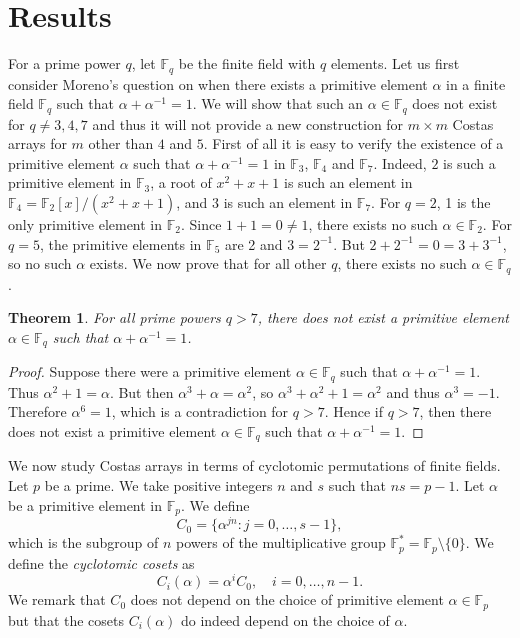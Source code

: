 \documentclass[10pt]{amsart}
\newtheorem{theorem}{Theorem}
\begin{document}
\section{Results}
For a prime power $q$, let $\mathbb{F}_q$ be the finite field with
$q$ elements.
Let us first consider Moreno's question \cite[Question~2]{MR1992966} on
when there exists a
primitive element $\alpha$ in a finite field $\mathbb{F}_q$ such
that $\alpha+\alpha^{-1}=1$. We will show that such an $\alpha \in \mathbb{F}_q$
does not  exist for $q \neq 3, 4, 7$ and
thus it will not provide a new construction for $m \times m$ Costas arrays for
$m$ other than $4$ and $5$.  First of all it is easy to verify the
existence of a primitive element $\alpha$ such that $\alpha +
\alpha^{-1} =1$ in $\mathbb{F}_3$,  $\mathbb{F}_4$ and
$\mathbb{F}_7$. Indeed, $2$ is such a primitive element in
$\mathbb{F}_3$, a root of $x^2+x+1$ is such an element in
$\mathbb{F}_4=\mathbb{F}_2[x]/(x^2+x+1)$, and $3$ is such
an element in $\mathbb{F}_7$. For $q=2$, 1 is the only
primitive element in $\mathbb{F}_2$. Since $1+1=0 \neq 1$, there
exists no such $\alpha \in \mathbb{F}_2$.
For $q=5$, the primitive elements in $\mathbb{F}_5$ are 2 and
$3=2^{-1}$. But $2+2^{-1}=0=3+3^{-1}$, so no such $\alpha$ exists.
We now prove that for all other $q$, there exists no such $\alpha \in
\mathbb{F}_q$.

\begin{theorem}
For all prime powers $q>7$, there does not exist a primitive element
$\alpha \in \mathbb{F}_q$ such that $\alpha+\alpha^{-1}=1$.
\end{theorem}
\begin{proof}
Suppose there were a primitive element $\alpha \in \mathbb{F}_q$ such that
$\alpha+\alpha^{-1}=1$. Thus $\alpha^2+1=\alpha$. But
then $\alpha^3+\alpha=\alpha^2$, so $\alpha^3+\alpha^2+1=\alpha^2$ and
thus $\alpha^3=-1$. Therefore $\alpha^6=1$, which is a contradiction
for $q>7$. Hence if $q>7$, then
there does not exist a primitive element $\alpha \in \mathbb{F}_q$ such that
$\alpha+\alpha^{-1}=1$.
\end{proof}

We now study Costas arrays in terms of cyclotomic permutations of
finite fields.
Let $p$ be a prime. 
We take positive integers $n$ and $s$ such that
$ns=p-1$. Let $\alpha$ be a primitive element in $\mathbb{F}_p$.
We define
\[
C_0=\big \{\alpha^{jn}:j=0,\ldots,s-1 \big \},
\]
which is the subgroup
of $n$ powers of the
multiplicative group $\mathbb{F}_p^*=\mathbb{F}_p \setminus \{0\}$.
We define the {\em
cyclotomic cosets} as
\[
C_i(\alpha)=\alpha^i C_0, \quad i=0,\ldots,n-1.
\]
We remark that $C_0$ does not depend on the choice of 
primitive element $\alpha \in \mathbb{F}_p$ but that the cosets
$C_i(\alpha)$ do indeed depend on the choice of $\alpha$.
\end{document}
